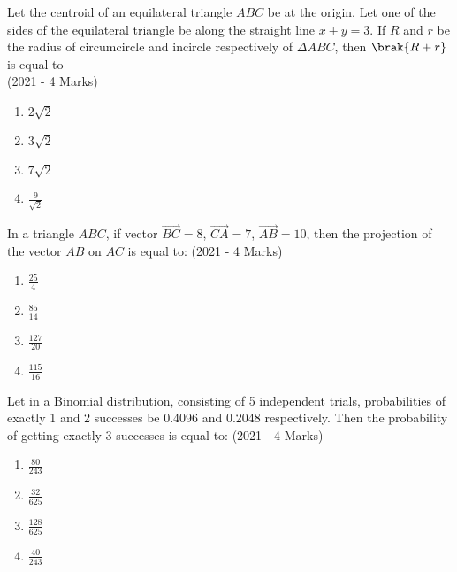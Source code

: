     \item{
            Let the centroid of an equilateral triangle $ABC$ be at the origin. Let one of the sides of the equilateral triangle be along the straight line $x + y = 3$. If $R$ and $r$ be the radius of circumcircle and incircle respectively of $\Delta ABC$, then $\brak{R + r}$ is equal to\\ \text{ }
             \hfill
                {(2021 - 4 Marks)}
            \begin{multicols}{4}
                \begin{enumerate}
                    \item $2\sqrt{2}$    
                    \item $3\sqrt{2}$    
                    \item $7\sqrt{2}$    
                    \item $\frac{9}{\sqrt{2}}$
                \end{enumerate}
            \end{multicols}

        
        }
    \item{
            In a triangle $ABC$, if vector $\overrightarrow{BC} = 8$, $\overrightarrow{CA} = 7$, $\overrightarrow{AB} = 10$, then the projection of the vector $AB$ on $AC$ is equal to:
             \hfill
                {(2021 - 4 Marks)}
            \begin{multicols}{4}
                \begin{enumerate}
                	\item $\frac{25}{4}$ 
                	\item $\frac{85}{14}$ 
                	\item $\frac{127}{20}$ 
                	\item $\frac{115}{16}$
                \end{enumerate}
            \end{multicols}
        
        }
    \item{
            Let in a Binomial distribution, consisting of 5 independent trials, probabilities of exactly 1 and 2 successes be 0.4096 and 0.2048 respectively. Then the probability of getting exactly 3 successes is equal to:
             \hfill
                {(2021 - 4 Marks)}
			\begin{multicols}{4}
				\begin{enumerate}
					\item $\frac{80}{243}$
					\item $\frac{32}{625}$
					\item $\frac{128}{625}$
					\item $\frac{40}{243}$
				\end{enumerate}
			\end{multicols}
        
        }
